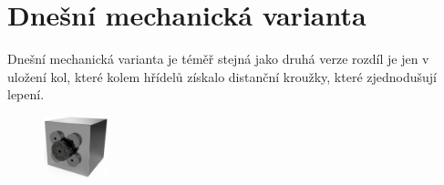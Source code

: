 \section*{Dnešní mechanická varianta}

Dnešní mechanická varianta je téměř stejná jako druhá verze rozdíl je jen v uložení kol, které kolem hřídelů získalo distanční kroužky, které
zjednodušují lepení. 

\begin{figure}[htbp]
    \centering
    \includegraphics[width=70]{kapitoly/obrazky/M3/predni_render.png}
    \label{fig:M1}
\end{figure}

